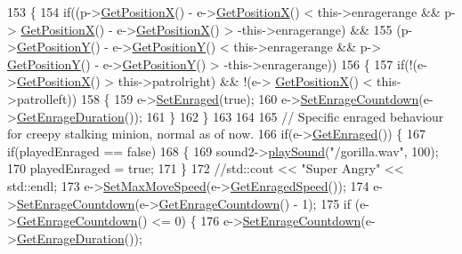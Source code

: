 \begin{DoxyCode}
153 \{
154     \textcolor{keywordflow}{if}((p->\hyperlink{classPlayerObject_aa84a7779304b680fa32b88b01ba95d02}{GetPositionX}() - e->\hyperlink{classAI_ade2ee4c9c75cdf9f4edd85227193e73d}{GetPositionX}() < this->enragerange && p->
      \hyperlink{classPlayerObject_aa84a7779304b680fa32b88b01ba95d02}{GetPositionX}() - e->\hyperlink{classAI_ade2ee4c9c75cdf9f4edd85227193e73d}{GetPositionX}() > -this->enragerange) &&
155        (p->\hyperlink{classPlayerObject_ad17b9ec44299f4dc9ca20064c883496b}{GetPositionY}() - e->\hyperlink{classAI_af234b480b8502f3dc1b1f3bac15e8b98}{GetPositionY}() <  this->enragerange && p->
      \hyperlink{classPlayerObject_ad17b9ec44299f4dc9ca20064c883496b}{GetPositionY}() - e->\hyperlink{classAI_af234b480b8502f3dc1b1f3bac15e8b98}{GetPositionY}() > -this->enragerange))
156     \{
157         \textcolor{keywordflow}{if}(!(e->\hyperlink{classAI_ade2ee4c9c75cdf9f4edd85227193e73d}{GetPositionX}() > this->patrolright) && !(e->
      \hyperlink{classAI_ade2ee4c9c75cdf9f4edd85227193e73d}{GetPositionX}() < this->patrolleft))
158         \{
159             e->\hyperlink{classAI_a9fbf2081f38575bc61a7f251b2bb9a3b}{SetEnraged}(\textcolor{keyword}{true});
160             e->\hyperlink{classAI_af9e9f4b5bef37e9800dbeb5e20adddf2}{SetEnrageCountdown}(e->\hyperlink{classAI_a41d1bb99dc6892c367c23a799ad9aec6}{GetEnrageDuration}());
161         \}
162     \}
163 
164 
165     \textcolor{comment}{// Specific enraged behaviour for creepy stalking minion, normal as of now.}
166     \textcolor{keywordflow}{if}(e->\hyperlink{classAI_aec03758c556c899055e9cbaf255dc500}{GetEnraged}()) \{
167         \textcolor{keywordflow}{if}(playedEnraged == \textcolor{keyword}{false})
168         \{
169             sound2->\hyperlink{classSounds_a5a93229c3804b9364b324a4e6245fcbe}{playSound}(\textcolor{stringliteral}{"/gorilla.wav"}, 100);
170             playedEnraged = \textcolor{keyword}{true};
171         \}
172         \textcolor{comment}{//std::cout << "Super Angry" << std::endl;}
173         e->\hyperlink{classAI_a4423ec546f1d37cec368321e119ac6b0}{SetMaxMoveSpeed}(e->\hyperlink{classAI_a92907b66d44bf13562d95e54cc5513b6}{GetEnragedSpeed}());
174         e->\hyperlink{classAI_af9e9f4b5bef37e9800dbeb5e20adddf2}{SetEnrageCountdown}(e->\hyperlink{classAI_adfd6fae7457c89e305d4d3f17ddc41a1}{GetEnrageCountdown}() - 1);
175         \textcolor{keywordflow}{if} (e->\hyperlink{classAI_adfd6fae7457c89e305d4d3f17ddc41a1}{GetEnrageCountdown}() <= 0) \{
176             e->\hyperlink{classAI_af9e9f4b5bef37e9800dbeb5e20adddf2}{SetEnrageCountdown}(e->\hyperlink{classAI_a41d1bb99dc6892c367c23a799ad9aec6}{GetEnrageDuration}());

\end{DoxyCode}
